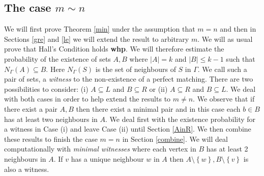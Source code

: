 \documentclass[11pt]{article}
\def\G{\Gamma}
\def\whp{{\bf whp}}
\newcommand{\set}[1]{\left\{#1\right\}}
\begin{document}
\subsection{The case $m\sim n$}\label{m=n}
We will first prove Theorem \ref{min} under the assumption that $m=n$ and then in Sections \ref{gre} and \ref{le} we will extend
the result to arbitrary $m$. We will as usual prove that Hall's Condition holds \whp. We will therefore estimate the 
probability of the existence of sets $A,B$ where $|A|=k$ and $|B|\leq k-1$ such that $N_\G(A)\subseteq B$. Here $N_\G(S)$ 
is the set of neighbours of $S$ in $\G$. We call such a pair of sets, a {\em witness} to the non-existence of a perfect matching.
There are two possibilities to consider: (i) $A\subseteq L$ and $B\subseteq R$ or
(ii) $A\subseteq R$ and $B\subseteq L$. We deal with both cases in order to help extend the results to $m\neq n$. We observe
that if there exist a pair $A,B$ then there exist a minimal pair and in this case each $b\in B$ has at least two neighbours in $A$.
We deal first with the existence probability for a witness in Case (i) and leave Case (ii) until Section \ref{AinR}. We then 
combine these results to finish the case $m=n$ in Section \ref{combine}. We will deal computationally with {\em minimal witnesses} 
where each vertex in $B$ has at least 2 neighbours in $A$. If $v$ has a unique neighbour $w$ in $A$ then 
$A\setminus\set{w},B\setminus\set{v}$ is also a witness. 
\end{document}
